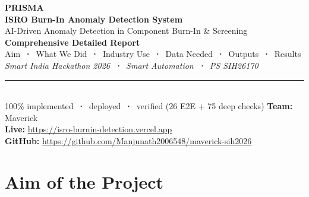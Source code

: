 \documentclass[11pt,a4paper]{article}
\begin{document}
\begin{titlepage}
  \centering
  \vspace*{1.5cm}
  {\Huge\bfseries\color{isroblue} PRISMA}\\[0.5cm]
  {\LARGE\bfseries ISRO Burn-In Anomaly Detection System}\\[0.3cm]
  {\large AI-Driven Anomaly Detection in Component Burn-In \& Screening}\\[1.2cm]
  {\Large\bfseries Comprehensive Detailed Report}\\[0.3cm]
  {\large Aim \,\textbf{·}\, What We Did \,\textbf{·}\, Industry Use \,\textbf{·}\, Data Needed \,\textbf{·}\, Outputs \,\textbf{·}\, Results}\\[1.5cm]
  {\itshape\large Smart India Hackathon 2026 \,\textbf{·}\, Smart Automation \,\textbf{·}\, PS SIH26170}\\[0.8cm]
  {\color{isroorange}\rule{0.6\textwidth}{1pt}}\\[1cm]
  {\normalsize 100\% implemented \,\textbf{·}\, deployed \,\textbf{·}\, verified (26 E2E + 75 deep checks)}
  \vfill
  {\normalsize\textbf{Team:} Maverick}\\[0.2cm]
  {\normalsize\textbf{Live:} \url{https://isro-burnin-detection.vercel.app}}\\[0.2cm]
  {\normalsize\textbf{GitHub:} \url{https://github.com/Manjunath2006548/maverick-sih2026}}
\end{titlepage}

\section{Aim of the Project}
\end{document}
